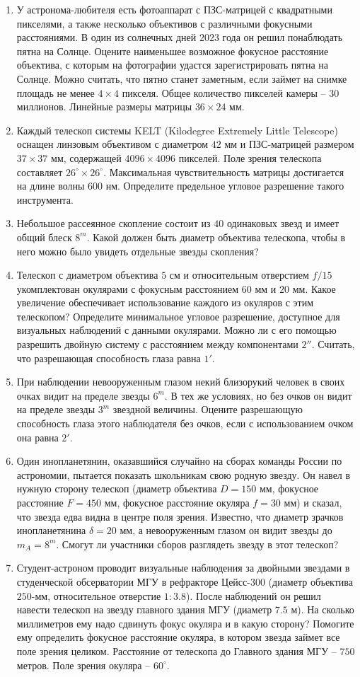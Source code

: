 \documentclass[12pt]{article}
\begin{document}
\begin{enumerate}
    \item У астронома-любителя есть фотоаппарат с ПЗС-матрицей с квадратными пикселями, а также несколько объективов с различными фокусными расстояниями. В один из солнечных дней $2023$ года он решил понаблюдать пятна на Солнце. Оцените наименьшее возможное фокусное расстояние объектива, с которым на фотографии удастся зарегистрировать пятна на Солнце. Можно считать, что пятно станет заметным, если займет на снимке площадь не менее $4\times4$ пикселя. Общее количество пикселей камеры -- $30$ миллионов. Линейные размеры матрицы $36\times24$ мм.
    \item Каждый телескоп системы KELT (Kilodegree Extremely Little Telescope) оснащен линзовым объективом с диаметром $42$ мм и ПЗС-матрицей размером $37\times37$ мм, содержащей $4096\times4096$ пикселей. Поле зрения телескопа составляет $26^{\circ}\times26^{\circ}$. Максимальная чувствительность матрицы достигается на длине волны $600$ нм. Определите предельное угловое разрешение такого инструмента.
    \item Небольшое рассеянное скопление состоит из $40$ одинаковых звезд и имеет общий блеск $8^m$. Какой должен быть диаметр объектива телескопа, чтобы в него можно было увидеть отдельные звезды скопления? 
    \item Телескоп с диаметром объектива $5$ см и относительным отверстием $f/15$ укомплектован окулярами с фокусным расстоянием $60$ мм и $20$ мм. Какое увеличение обеспечивает использование каждого из окуляров с этим телескопом? Определите минимальное угловое разрешение, доступное для визуальных наблюдений с данными окулярами. Можно ли с его помощью разрешить двойную систему с расстоянием между компонентами $2''$. Считать, что разрешающая способность глаза равна $1'$. 
    \item При наблюдении невооруженным глазом некий близорукий человек в своих очках видит на пределе звезды $6^m$. В тех же условиях, но без очков он видит на пределе звезды $3^m$ звездной величины. Оцените разрешающую способность глаза этого наблюдателя без очков, если с использованием очком она равна $2'$.
    \item Один инопланетянин, оказавшийся случайно на сборах команды России по астрономии, пытается показать школьникам свою родную звезду. Он навел в нужную сторону телескоп (диаметр объектива $D = 150$ мм, фокусное расстояние $F = 450$ мм, фокусное расстояние окуляра $f = 30$ мм) и сказал, что звезда едва видна в центре поля зрения. Известно, что диаметр зрачков инопланетянина $\delta = 20$ мм, а невооруженным глазом он видит звезды до $m_A = 8^m$. Смогут ли участники сборов разглядеть звезду в этот телескоп?
    \item Студент-астроном проводит визуальные наблюдения за двойными звездами в студенческой обсерватории МГУ в рефракторе Цейсс-300 (диаметр объектива $250$-мм, относительное отверстие $1:3.8$). После наблюдений он решил навести телескоп на звезду главного здания МГУ (диаметр $7.5$ м). На сколько миллиметров ему надо сдвинуть фокус окуляра и в какую сторону? Помогите ему определить фокусное расстояние окуляра, в котором звезда займет все поле зрения целиком. Расстояние от телескопа до Главного здания МГУ -- $750$ метров. Поле зрения окуляра -- $60^{\circ}$.
\end{enumerate}
\end{document}

